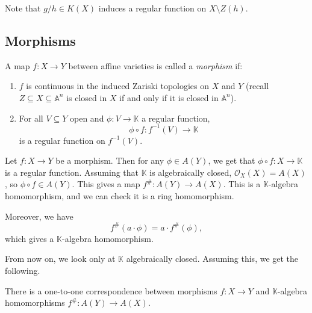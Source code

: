 \documentclass[12pt]{article}
\begin{document}
Note that $g/h \in K(X)$ induces a regular function on $X \setminus Z(h)$.

\subsection{Morphisms}
\label{sub:morph}

\begin{definition}
	A map $f : X \to Y$ between affine varieties is called a \emph{morphism} if:
	\begin{enumerate}
		\item $f$ is continuous in the induced Zariski topologies on $X$ and $Y$ (recall $Z \subseteq X \subseteq \mathbb{A}^n$ is closed in $X$ if and only if it is closed in $\mathbb{A}^n$).
		\item For all $V \subseteq Y$ open and $\phi : V \to \mathbb{K}$ a regular function,
			\[
			\phi \circ f : f^{-1}(V) \to \mathbb{K}
			\]
			is a regular function on $f^{-1}(V)$.
	\end{enumerate}
\end{definition}

Let $f : X \to Y$ be a morphism. Then for any $\phi \in A(Y)$, we get that $\phi \circ f : X \to \mathbb{K}$ is a regular function. Assuming that $\mathbb{K}$ is algebraically closed, $\mathcal{O}_X(X) = A(X)$, so $\phi \circ f \in A(Y)$. This gives a map $f^{\#} : A(Y) \to A(X)$. This is a $\mathbb{K}$-algebra homomorphism, and we can check it is a ring homomorphism.

Moreover, we have
\[
f^{\#}(a \cdot \phi) = a \cdot f^{\#}(\phi),
\]
which gives a $\mathbb{K}$-algebra homomorphism.

From now on, we look only at $\mathbb{K}$ algebraically closed. Assuming this, we get the following.

\begin{theorem}
	There is a one-to-one correspondence between morphisms $f : X \to Y$ and $\mathbb{K}$-algebra homomorphisms $f^{\#} : A(Y) \to A(X)$.
\end{theorem}
\end{document}
